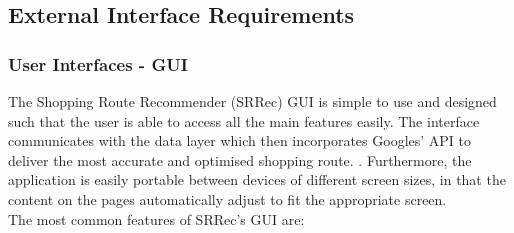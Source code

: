 \documentclass[10pt,twocolumn]{witseiepaper}
\begin{document}
		
		\subsection{External Interface Requirements}
		
		\subsubsection{User Interfaces - GUI}
		
		The Shopping Route Recommender (SRRec) GUI is simple to use and designed such that the user is able to access all the main features easily. The interface communicates with the data layer which then incorporates Googles' API to deliver the most accurate and optimised shopping route. . Furthermore, the application is easily portable between devices of different screen sizes, in that the content on the pages automatically adjust to fit the appropriate screen.\\
		
		The most common features of SRRec's GUI are:
		
\end{document}
